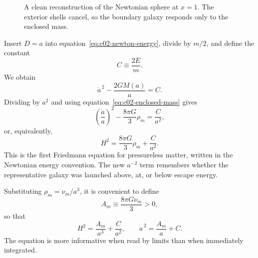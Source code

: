 \begin{figure}[ht]
\centering
{}
\caption{A clean reconstruction of the Newtonian sphere at \(x=1\). The exterior shells cancel, so the boundary galaxy responds only to the enclosed mass.}
\label{fig:c02-sphere-redraw}
\end{figure}

Insert \(D=a\) into equation~\eqref{eq:c02-newton-energy}, divide by \(m/2\), and define the constant
\begin{equation}
C\equiv\frac{2E}{m}.
\end{equation}
We obtain
\begin{equation}
\dot a^{\,2}-\frac{2GM(a)}{a}=C.
\label{eq:c02-energy-a}
\end{equation}
Dividing by \(a^2\) and using equation~\eqref{eq:c02-enclosed-mass} gives
\begin{equation}
\left(\frac{\dot a}{a}\right)^2-
\frac{8\pi G}{3}\rho_m=\frac{C}{a^2},
\label{eq:c02-energy-form}
\end{equation}
or, equivalently,
\begin{equation}
\boxed{H^2=\frac{8\pi G}{3}\rho_m+\frac{C}{a^2}.}
\label{eq:c02-friedmann-C}
\end{equation}
This is the first Friedmann equation for pressureless matter, written in the Newtonian energy convention. The new \(a^{-2}\) term remembers whether the representative galaxy was launched above, at, or below escape energy.

Substituting \(\rho_m=\nu_m/a^3\), it is convenient to define
\begin{equation}
A_m\equiv\frac{8\pi G\nu_m}{3}>0,
\end{equation}
so that
\begin{equation}
H^2=\frac{A_m}{a^3}+\frac{C}{a^2},
\qquad
\dot a^{\,2}=\frac{A_m}{a}+C.
\label{eq:c02-energy-branches}
\end{equation}
The equation is more informative when read by limits than when immediately integrated.

